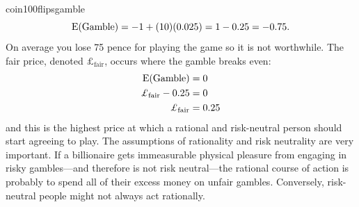 \begin{answer}{coin100flipsgamble}
\[
  \operatorname{\mathrm{E}}(\text{Gamble}) = -1 + (10)(0.025) = 1 - 0.25 = -0.75
  \text{.}
\]
On average you lose 75 pence for playing the game so it is not worthwhile.
The fair price, denoted $\pounds_{\text{fair}}$, occurs where the gamble breaks even:
\begin{align*}
  \E(\text{Gamble})     &=  0    \\
  \pounds_{\text{fair}} - 0.25 &=  0    \\
  \pounds_{\text{fair}}        &=  0.25
\end{align*}
and this is the highest price at which a
rational and risk-neutral person should start agreeing to play.
The assumptions of rationality and risk neutrality are very important.
If a billionaire gets immeasurable physical pleasure from engaging in risky gambles---and therefore is not risk neutral---the rational course of action is probably to spend all of their excess money on unfair gambles.
Conversely, risk-neutral people might not always act rationally.

\end{answer}
